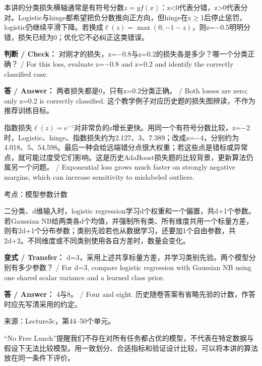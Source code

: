 本讲的分类损失横轴通常是有符号分数\(z=yf(x)\)：z<0代表分错，z>0代表分对。Logistic与hinge都希望把负分数推向正方向，但hinge在z\ensuremath{\ge}1后停止惩罚，logistic仍继续平滑下降。若换成\(\ell(z)=\max(0,-1-z)\)，则z=\ensuremath{-}0.5明明分错，损失已经为0；优化它不必纠正这类错误。


\textbf{判断 / Check：} 对刚才的损失，z=\ensuremath{-}0.8与z=0.2的损失各是多少？哪一个分类正确？ / For this loss, evaluate z=\ensuremath{-}0.8 and z=0.2 and identify the correctly classified case.


\textbf{答 / Answer：} 两者损失都是0，只有z=0.2分类正确。 / Both losses are zero; only z=0.2 is correctly classified. 这个教学例子对应历史题的损失图辨读，不作为推荐训练目标。


指数损失\(\ell(z)=e^{-z}\)对非常负的z增长更快。用同一个有符号分数比较，z=\ensuremath{-}2时，Logistic、hinge、指数损失约为2.127、3、7.389；改成z=\ensuremath{-}4，分别约为4.018、5、54.598。最后一种会给远端错分点很大权重；若这些点是错标或异常点，就可能过度受它们影响。这是历史AdaBoost损失题的比较背景，更新算法仍属另一个问题。 / Exponential loss grows much faster on strongly negative margins, which can increase sensitivity to mislabeled outliers.








考点：模型参数计数

二分类、d维输入时，logistic regression学习d个权重和一个偏置，共d+1个参数。若Gaussian NB给两类各d个均值，并强制所有类、所有维度共用一个标量方差，则有2d+1个分布参数；类别先验若也从数据学习，还要加1个自由参数，共2d+2。不同维度或不同类别使用各自方差时，数量会变化。


\textbf{变式 / Transfer：} d=3，采用上述共享标量方差，并学习类别先验。两个模型分别有多少参数？ / For d=3, compare logistic regression with Gaussian NB using one shared scalar variance and a learned class prior.


\textbf{答 / Answer：} 4与8。 / Four and eight. 历史随卷答案有省略先验的计数，作答时应先写清采用的约定。


来源：Lecture3c，第44–50个单元。


“No Free Lunch”提醒我们不存在对所有任务都占优的模型，不代表在特定数据与假设下无法比较模型。用一致划分、合适指标和验证设计比较，可以将本讲的算法放在同一条件下评价。


